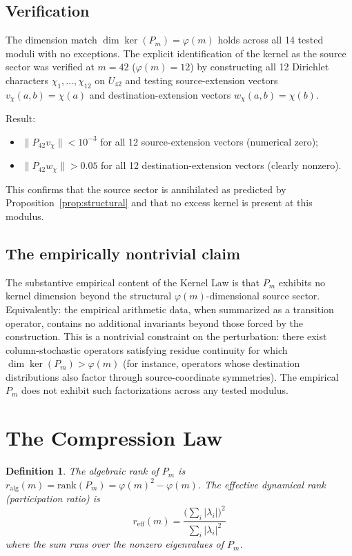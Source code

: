 \documentclass[11pt,a4paper]{article}
\newtheorem{definition}{Definition}
\begin{document}
\subsection{Verification}

The dimension match $\dim \ker(P_m) = \varphi(m)$ holds across all 14 tested moduli with no exceptions. The explicit identification of the kernel as the source sector was verified at $m = 42$ ($\varphi(m) = 12$) by constructing all 12 Dirichlet characters $\chi_1, \ldots, \chi_{12}$ on $U_{42}$ and testing source-extension vectors $v_\chi(a, b) = \chi(a)$ and destination-extension vectors $w_\chi(a, b) = \chi(b)$.

Result:
\begin{itemize}
\item $\|P_{42} v_\chi\| < 10^{-3}$ for all 12 source-extension vectors (numerical zero);
\item $\|P_{42} w_\chi\| > 0.05$ for all 12 destination-extension vectors (clearly nonzero).
\end{itemize}

This confirms that the source sector is annihilated as predicted by Proposition~\ref{prop:structural} and that no excess kernel is present at this modulus.

\subsection{The empirically nontrivial claim}

The substantive empirical content of the Kernel Law is that $P_m$ exhibits no kernel dimension beyond the structural $\varphi(m)$-dimensional source sector. Equivalently: the empirical arithmetic data, when summarized as a transition operator, contains no additional invariants beyond those forced by the construction. This is a nontrivial constraint on the perturbation: there exist column-stochastic operators satisfying residue continuity for which $\dim \ker(P_m) > \varphi(m)$ (for instance, operators whose destination distributions also factor through source-coordinate symmetries). The empirical $P_m$ does not exhibit such factorizations across any tested modulus.

\section{The Compression Law}
\label{sec:compression}

\begin{definition}
The \emph{algebraic rank} of $P_m$ is $r_{\text{alg}}(m) = \mathrm{rank}(P_m) = \varphi(m)^2 - \varphi(m)$. The \emph{effective dynamical rank} (participation ratio) is
\begin{equation}
r_{\text{eff}}(m) = \frac{\bigl(\sum_i |\lambda_i|\bigr)^2}{\sum_i |\lambda_i|^2}
\end{equation}
where the sum runs over the nonzero eigenvalues of $P_m$.
\end{definition}
\end{document}
